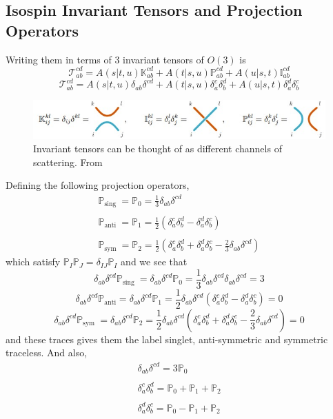 ﻿\documentclass[12pt,a4paper]{article}
\begin{document}
\subsection{Isospin Invariant Tensors and Projection Operators}
Writing them in terms of $3$ invariant tensors of $O(3)$ is
$$\mathcal{T}_{a b}^{c d}=A(s|t, u) \mathbb{K}_{a b}^{c d}+A(t|s, u)\mathbb{P}_{a b}^{c d}+A(u|s, t) \mathbb{I}_{a b}^{c d}$$
$$\mathcal{T}_{a b}^{c d}=A(s|t, u) \delta_{a b} \delta^{c d}+A(t|s, u) \delta_{a}^{c} \delta_{b}^{d} +A(u|s, t) \delta_{a}^{d} \delta_{b}^{c}$$
\begin{figure}[H]
  \includegraphics[width=\linewidth]{1.jpg}
  \caption{Invariant tensors can be thought of as different channels of scattering. From \cite{1}}
  \label{fig:1}
\end{figure}
Defining the following projection operators,
$$
\begin{array}{l}
\mathbb{P}_{\text {sing }}=\mathbb{P}_{0}=\frac{1}{3} \delta_{a b} \delta^{c d} \\\\
\mathbb{P}_{\text {anti }}=\mathbb{P}_{1}=\frac{1}{2}\left(\delta_{a}^{c} \delta_{b}^{d}-\delta_{a}^{d} \delta_{b}^{c}\right) \\\\
\mathbb{P}_{\text {sym }}=\mathbb{P}_{2}=\frac{1}{2}\left(\delta_{a}^{c} \delta_{b}^{d}+\delta_{a}^{d} \delta_{b}^{c}-\frac{2}{3} \delta_{a b} \delta^{c d}\right)
\end{array}
$$
which satisfy $\mathbb{P}_{I} \mathbb{P}_{J}=\delta_{I J}\mathbb{P}_{I}$ and we see that
$$
\delta_{a b} \delta^{c d}\mathbb{P}_{\text {sing }}=\delta_{a b} \delta^{c d}\mathbb{P}_{0}=\frac{1}{3}\delta_{a b} \delta^{c d} \delta_{a b} \delta^{c d}=3
$$
$$
\delta_{a b} \delta^{c d}\mathbb{P}_{\text {anti}}=\delta_{a b} \delta^{c d}\mathbb{P}_{1}=\frac{1}{2}\delta_{a b} \delta^{c d}\left(\delta_{a}^{c} \delta_{b}^{d}-\delta_{a}^{d} \delta_{b}^{c}\right)=0
$$
$$
\delta_{a b} \delta^{c d}\mathbb{P}_{\text {sym }}=\delta_{a b} \delta^{c d}\mathbb{P}_{2}=\frac{1}{2}\delta_{a b} \delta^{c d}\left(\delta_{a}^{c} \delta_{b}^{d}+\delta_{a}^{d} \delta_{b}^{c}-\frac{2}{3} \delta_{a b} \delta^{c d}\right)=0
$$
and these traces gives them the label singlet, anti-symmetric and symmetric traceless. And also,
$$
\begin{array}{l}
\delta_{a b} \delta^{c d}=3\mathbb{P}_{0} \\\\
\delta_{a}^{c} \delta_{b}^{d}=\mathbb{P}_{0}+\mathbb{P}_{1}+\mathbb{P}_{2}\\\\
\delta_{a}^{d} \delta_{b}^{c}=\mathbb{P}_{0}-\mathbb{P}_{1}+\mathbb{P}_{2}
\end{array}
$$
\end{document}
